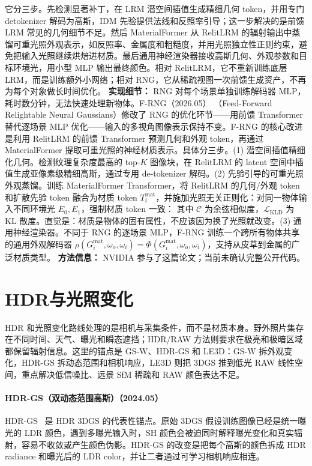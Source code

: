 它分三步。先检测显著补丁，在 LRM 潜空间插值生成精细几何 token，并用专门 detokenizer 解码为高斯，IDM 先验提供法线和反照率引导；这一步解决的是前馈 LRM 常见的几何细节不足。然后 MaterialFormer 从 RelitLRM 的辐射输出中蒸馏可重光照外观表示，如反照率、金属度和粗糙度，并用光照独立性正则约束，避免把输入光照继续烘焙进材质。最后通用神经渲染器接收高斯几何、外观参数和目标环境光，用小型 MLP 输出最终颜色。相对 RelitLRM，它不重新训练底层 LRM，而是训练额外小网络；相对 RNG，它从稀疏视图一次前馈生成资产，不再为每个对象做长时间优化。
\textbf{实现细节：} RNG 对每个场景单独训练解码器 MLP，耗时数分钟，无法快速处理新物体。F-RNG（2026.05） （Feed-Forward Relightable Neural Gaussians）修改了 RNG 的优化环节——用前馈 Transformer 替代逐场景 MLP 优化——输入的多视角图像表示保持不变。F-RNG 的核心改进是利用 RelitLRM 的前馈 Transformer 预测几何和外观 token，再通过 MaterialFormer 提取可重光照的神经材质表示。具体分三步。(1) 潜空间插值精细化几何。检测纹理复杂度最高的 top-$K$ 图像块，在 RelitLRM 的 latent 空间中插值生成亚像素级精细高斯，通过专用 de-tokenizer 解码。(2) 先验引导的可重光照外观蒸馏。训练 MaterialFormer Transformer，将 RelitLRM 的几何/外观 token 和扩散先验 token 融合为材质 token $T_i^{\mathrm{mat}}$，并施加光照无关正则化：对同一物体输入不同环境光 $E_0, E_1$，强制材质 token 一致： 其中 $\mathcal{C}$ 为余弦相似度，$\mathcal{L}_{\mathrm{KLD}}$ 为 KL 散度。直觉是：材质是物体的固有属性，不应该因为换了光照就改变。(3) 通用神经渲染器。不同于 RNG 的逐场景 MLP，F-RNG 训练一个跨所有物体共享的通用外观解码器 $\rho(G_i^{\mathrm{mat}}, \omega_o, \omega_i) = \Phi(G_i^{\mathrm{mat}}, \omega_o, \omega_i)$，支持从皮草到金属的广泛材质类型。
\textbf{方法信息：} NVIDIA 参与了这篇论文；当前未确认完整公开代码。



\section{HDR与光照变化}

HDR 和光照变化路线处理的是相机与采集条件，而不是材质本身。野外照片集存在不同时间、天气、曝光和瞬态遮挡；HDR/RAW 方法则要求在极亮和极暗区域都保留辐射信息。这里的锚点是 GS-W、HDR-GS 和 LE3D：GS-W 拆外观变化，HDR-GS 拆动态范围和相机响应，LE3D 则把 3DGS 推到低光 RAW 线性空间，重点解决低信噪比、远景 SfM 稀疏和 RAW 颜色表达不足。


\paragraph{HDR-GS（双动态范围高斯）（2024.05）}
HDR-GS~\cite{2405_15125} 是 HDR 3DGS 的代表性锚点。原始 3DGS 假设训练图像已经是统一曝光的 LDR 颜色，遇到多曝光输入时，SH 颜色会被迫同时解释曝光变化和真实辐射，容易不收敛或产生颜色伪影。HDR-GS 的改变是把每个高斯的颜色拆成 HDR radiance 和曝光后的 LDR color，并让二者通过可学习相机响应相连。

